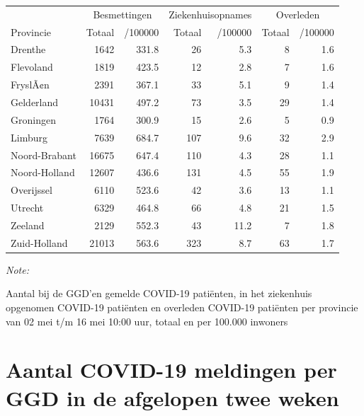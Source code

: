 \documentclass[
  english,
  man,floatsintext]{apa6}
\begin{document}
\begin{table}
\centering
\begin{threeparttable}
\begin{tabular}{lrrrrrr}
\toprule
\multicolumn{1}{c}{ } & \multicolumn{2}{c}{Besmettingen} & \multicolumn{2}{c}{Ziekenhuisopnames} & \multicolumn{2}{c}{Overleden} \\
\cmidrule(l{3pt}r{3pt}){2-3} \cmidrule(l{3pt}r{3pt}){4-5} \cmidrule(l{3pt}r{3pt}){6-7}
Provincie & Totaal & /100000 & Totaal & /100000 & Totaal & /100000\\
\midrule
Drenthe & 1642 & 331.8 & 26 & 5.3 & 8 & 1.6\\
Flevoland & 1819 & 423.5 & 12 & 2.8 & 7 & 1.6\\
FryslÃ¢n & 2391 & 367.1 & 33 & 5.1 & 9 & 1.4\\
Gelderland & 10431 & 497.2 & 73 & 3.5 & 29 & 1.4\\
Groningen & 1764 & 300.9 & 15 & 2.6 & 5 & 0.9\\
Limburg & 7639 & 684.7 & 107 & 9.6 & 32 & 2.9\\
Noord-Brabant & 16675 & 647.4 & 110 & 4.3 & 28 & 1.1\\
Noord-Holland & 12607 & 436.6 & 131 & 4.5 & 55 & 1.9\\
Overijssel & 6110 & 523.6 & 42 & 3.6 & 13 & 1.1\\
Utrecht & 6329 & 464.8 & 66 & 4.8 & 21 & 1.5\\
Zeeland & 2129 & 552.3 & 43 & 11.2 & 7 & 1.8\\
Zuid-Holland & 21013 & 563.6 & 323 & 8.7 & 63 & 1.7\\
\bottomrule
\end{tabular}
\begin{tablenotes}
\item \textit{Note: } 
\item Aantal bij de GGD’en gemelde COVID-19 patiënten, in het ziekenhuis opgenomen COVID-19 patiënten en overleden COVID-19 patiënten per provincie van 02 mei t/m 16 mei 10:00 uur, totaal en per 100.000 inwoners
\end{tablenotes}
\end{threeparttable}
\end{table}

\newpage

\hypertarget{aantal-covid-19-meldingen-per-ggd-in-de-afgelopen-twee-weken}{%
\section{Aantal COVID-19 meldingen per GGD in de afgelopen twee weken}\label{aantal-covid-19-meldingen-per-ggd-in-de-afgelopen-twee-weken}}
\end{document}
